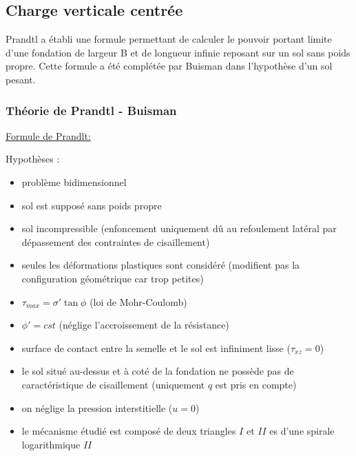     \subsection{Charge verticale centrée}
    
        Prandtl a établi une formule permettant de calculer le pouvoir portant limite d'une fondation de largeur B et de longueur infinie reposant sur un sol sans poids propre. Cette formule a été complétée par Buisman dans l'hypothèse d'un sol pesant.
        
        \subsubsection{Théorie de Prandtl - Buisman}
        
            \underline{Formule de Prandlt:} 
            
            Hypothèses : \begin{itemize}
                \item problème bidimensionnel
                \item sol est supposé sans poids propre
                \item sol incompressible (enfoncement uniquement dû au refoulement latéral par dépassement des contraintes de cisaillement)
                \item seules les déformations plastiques sont considéré (modifient pas la configuration géométrique car trop petites)
                \item $\tau_{max} = \sigma' \tan \phi$ (loi de Mohr-Coulomb)
                \item $\phi' = cst$ (néglige l'accroissement de la résistance)
                \item surface de contact entre la semelle et le sol est infiniment lisse ($\tau_{xz} = 0$)
                \item le sol situé au-dessus et à coté de la fondation ne possède pas de caractéristique de cisaillement (uniquement $q$ est pris en compte)
                \item on néglige la pression interstitielle ($u=0$)
                \item le mécanisme étudié est composé de deux triangles $I$ et $II$ es d'une spirale logarithmique $II$
            \end{itemize} 
            
